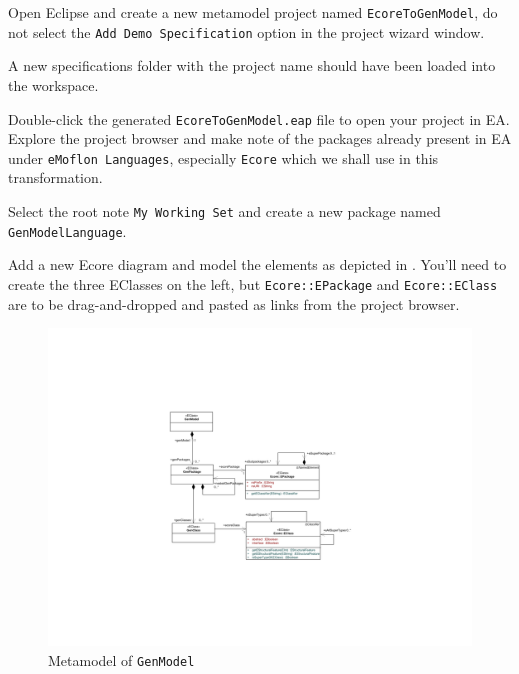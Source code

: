 \begin{stepbystep}

\item Open Eclipse and create a new metamodel project named \texttt{Ecore\-To\-Gen\-Model}, do not select the \texttt{Add Demo Specification}
option in the project wizard window.

\item A new specifications folder with the project name should have been loaded into the workspace.

\item Double-click the generated \texttt{Ecore\-To\-Gen\-Model.eap} file to open your project in EA. 
Explore the project browser and make note of the packages already present in EA under \texttt{eMoflon Languages}, especially \texttt{Ecore} which we shall use in this transformation.

\item Select the root note \texttt{My Working Set} and create a new package named \texttt{Gen\-Model\-Language}. 

\item Add a new Ecore diagram and model the elements as depicted in . You'll need to create the three EClasses on
the left, but \texttt{Ecore::EPackage} and \texttt{Ecore::EClass} are to be drag-and-dropped and pasted as links from the project browser. 

\vspace{0.5cm}

\begin{figure}[htbp]
\begin{center}  
	\includegraphics[width=\textwidth]{../../org.moflon.doc.handbook.05_miscellaneous/3_existingEMF/emfImages/CDGenmodel.pdf}
	\caption{Metamodel of \texttt{GenModel}}  
\label{fig_gMM}
\end{center}
\end{figure} 


\end{stepbystep}
